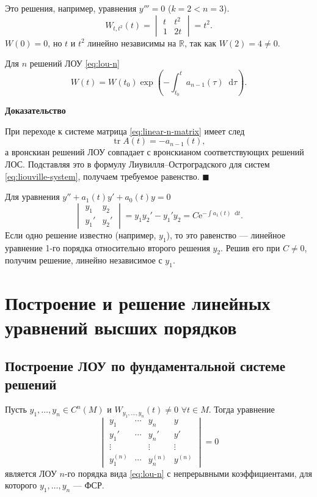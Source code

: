 \documentclass[12pt,a4paper]{article}
\numberwithin{equation}{section}
\newcommand{\R}{\mathbb{R}}
\newcommand{\e}{\mathrm{e}}
\newcommand{\tr}{\operatorname{tr}}
\newcommand{\dd}{\mathop{}\!\mathrm{d}}
\renewenvironment{proof}[1][Доказательство]{\begin{center}\textbf{#1}\end{center}}{\hfill$\blacksquare$\par}
\DeclareRobustCommand{\examtag}[1]{\space{\normalfont\small\color{HSEgray}(#1)}}
\begin{document}
\begin{exampleHSE}[\(y_1=t,\ y_2=t^2,\ M=\R\)]
Это решения, например, уравнения \(y'''=0\) (\(k=2<n=3\)).
\[
W_{t,t^2}(t)=
\begin{vmatrix}t&t^2\\1&2t\end{vmatrix}=t^2.
\]
\(W(0)=0\), но \(t\) и \(t^2\) линейно независимы на \(\R\), так как \(W(2)=4\neq0\).
\end{exampleHSE}

\begin{theoremHSE}
Для \(n\) решений ЛОУ \eqref{eq:lou-n}
\[
W(t)=W(t_0)\exp\left(-\int_{t_0}^{t}a_{n-1}(\tau)\dd\tau\right).
\]
\end{theoremHSE}

\begin{proof}
При переходе к системе матрица \eqref{eq:linear-n-matrix} имеет след
\[
\tr A(t)=-a_{n-1}(t),
\]
а вронскиан решений ЛОУ совпадает с вронскианом соответствующих решений ЛОС. Подставляя это в формулу Лиувилля--Остроградского для систем \eqref{eq:liouville-system}, получаем требуемое равенство.
\end{proof}

\begin{remarkHSE}[Случай \(n=2\)]
Для уравнения \(y''+a_1(t)y'+a_0(t)y=0\)
\[
\begin{vmatrix}y_1&y_2\\y_1'&y_2'\end{vmatrix}=y_1y_2'-y_1'y_2=C\e^{-\int a_1(t)\dd t}.
\]
Если одно решение известно (например, \(y_1\)), то это равенство --- линейное уравнение 1-го порядка относительно второго решения \(y_2\). Решив его при \(C\neq0\), получим решение, линейно независимое с \(y_1\).
\end{remarkHSE}

\section{Построение и решение линейных уравнений высших порядков\examtag{вопрос~18}}

\subsection{Построение ЛОУ по фундаментальной системе решений}
\label{subsec:lou-by-fsr}

\begin{theoremHSE}
Пусть \(y_1,\ldots,y_n\in C^n(M)\) и \(W_{y_1,\ldots,y_n}(t)\neq0\) \(\forall t\in M\). Тогда уравнение
\begin{equation}
\begin{vmatrix}
y_1&\cdots&y_n&y\\
y_1'&\cdots&y_n'&y'\\
\vdots&&\vdots&\vdots\\
y_1^{(n)}&\cdots&y_n^{(n)}&y^{(n)}
\end{vmatrix}=0
\label{eq:lou-by-fsr}
\end{equation}
является ЛОУ \(n\)-го порядка вида \eqref{eq:lou-n} с непрерывными коэффициентами, для которого \(y_1,\ldots,y_n\) --- ФСР.
\end{theoremHSE}
\end{document}
